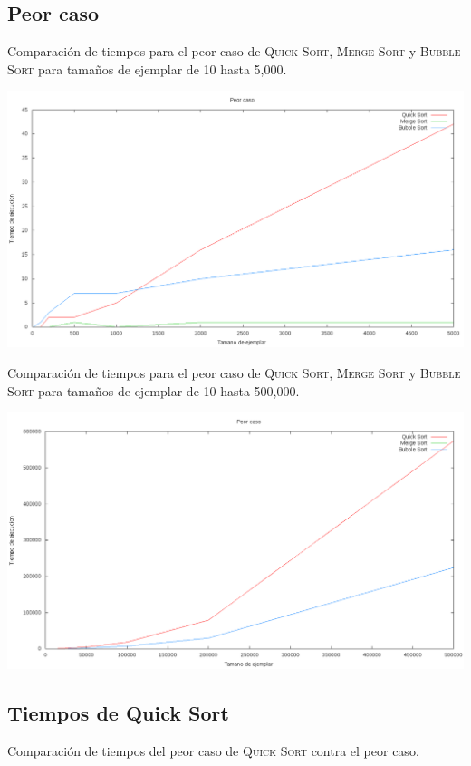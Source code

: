 \documentclass[spanish,12pt,letterpaper]{article}
\begin{document}
\subsection{Peor caso}

Comparación de tiempos para el peor caso de \textsc{Quick Sort}, \textsc{Merge Sort} y \textsc{Bubble Sort} para tamaños de ejemplar de 10 hasta 5,000.

{
\includegraphics[scale=0.5]{peorcaso_5m}
\centering
}

\newpage
Comparación de tiempos para el peor caso de \textsc{Quick Sort}, \textsc{Merge Sort} y \textsc{Bubble Sort} para tamaños de ejemplar de 10 hasta 500,000.

{
\includegraphics[scale=0.5]{peorcaso_500m}
\centering
}

\subsection{Tiempos de Quick Sort}

Comparación de tiempos del peor caso de \textsc{Quick Sort} contra el peor caso.
\end{document}

